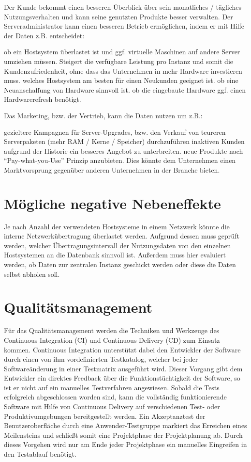 Der Kunde bekommt einen besseren Überblick über sein monatliches / tägliches
Nutzungsverhalten und kann seine genutzten Produkte besser verwalten. Der
Serveradministrator kann einen besseren Betrieb ermöglichen, indem er mit Hilfe
der Daten z.B. entscheidet:
\begin{outline}
    \1 ob ein Hostsystem überlastet ist und ggf. virtuelle Maschinen auf andere
       Server umziehen müssen. Steigert die verfügbare Leistung pro Instanz und
       somit die Kundenzufriedenheit, ohne dass das Unternehmen in mehr Hardware
       investieren muss.
    \1 welches Hostsystem am besten für einen Neukunden geeignet ist.
    \1 ob eine Neuanschaffung von Hardware sinnvoll ist.
    \1 ob die eingebaute Hardware ggf. einen Hardwarerefresh benötigt.
\end{outline}

Das Marketing, bzw. der Vertrieb, kann die Daten nutzen um z.B.:
\begin{outline}
    \1 gezieltere Kampagnen für Server-Upgrades, bzw. den Verkauf von teureren
       Serverpaketen (mehr RAM / Kerne / Speicher) durchzuführen
    \1 inaktiven Kunden aufgrund der Historie ein besseres Angebot zu
       unterbreiten.
    \1 neue Produkte nach “Pay-what-you-Use” Prinzip anzubieten. Dies könnte dem
       Unternehmen einen Marktvorsprung gegenüber anderen Unternehmen in der
       Branche bieten.
\end{outline}

\section{Mögliche negative Nebeneffekte}

Je nach Anzahl der verwendeten Hostsysteme in einem Netzwerk könnte die interne
Netzwerkübertragung überlastet werden. Aufgrund dessen muss geprüft werden,
welcher Übertragungsintervall der Nutzungsdaten von den einzelnen Hostsystemen
an die Datenbank sinnvoll ist. Außerdem muss hier evaluiert werden, ob Daten
zur zentralen Instanz geschickt werden oder diese die Daten selbst abholen
soll.

\section{Qualitätsmanagement}
Für das Qualitätsmanagement werden die Techniken und Werkzeuge des Continuous
Integration (CI) und Continuous Delivery (CD) zum Einsatz kommen. Continuous
Integration unterstützt dabei den Entwickler der Software durch einen von ihm
vordefinierten Testkatalog, welcher bei jeder Softwareänderung in einer
Testmatrix ausgeführt wird. Dieser Vorgang gibt dem Entwickler ein direktes
Feedback über die Funktionstüchtigkeit der Software, so ist er nicht auf ein
manuelles Testverfahren angewiesen. Sobald die Tests erfolgreich abgeschlossen
worden sind, kann die vollständig funktionierende Software mit Hilfe von
Continuous Delivery auf verschiedenen Test- oder Produktivumgebungen
bereitgestellt werden. Ein Akzeptanztest der Benutzeroberfläche durch eine
Anwender-Testgruppe markiert das Erreichen eines Meilensteins und schließt
somit eine Projektphase der Projektplanung ab. Durch dieses Vorgehen wird nur
am Ende jeder Projektphase ein manuelles Eingreifen in den Testablauf benötigt.

